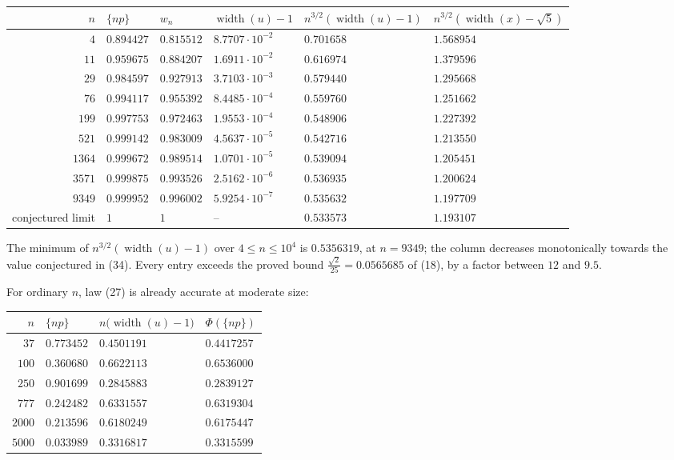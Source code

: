 \documentclass[12pt]{article}
\newcommand{\W}{\operatorname{width}}
\begin{document}
\begin{center}
\small
\renewcommand{\arraystretch}{1.3}
\begin{tabularx}{\textwidth}{@{}rXXXXX@{}}
\toprule
\(n\) & \(\{np\}\) & \(w_n\) & \(\W(u)-1\) & \(n^{3/2}(\W(u)-1)\) & \(n^{3/2}(\W(x)-\sqrt5)\) \\
\midrule
\(4\)    & \(0.894427\) & \(0.815512\) & \(8.7707\cdot10^{-2}\) & \(0.701658\) & \(1.568954\) \\
\(11\)   & \(0.959675\) & \(0.884207\) & \(1.6911\cdot10^{-2}\) & \(0.616974\) & \(1.379596\) \\
\(29\)   & \(0.984597\) & \(0.927913\) & \(3.7103\cdot10^{-3}\) & \(0.579440\) & \(1.295668\) \\
\(76\)   & \(0.994117\) & \(0.955392\) & \(8.4485\cdot10^{-4}\) & \(0.559760\) & \(1.251662\) \\
\(199\)  & \(0.997753\) & \(0.972463\) & \(1.9553\cdot10^{-4}\) & \(0.548906\) & \(1.227392\) \\
\(521\)  & \(0.999142\) & \(0.983009\) & \(4.5637\cdot10^{-5}\) & \(0.542716\) & \(1.213550\) \\
\(1364\) & \(0.999672\) & \(0.989514\) & \(1.0701\cdot10^{-5}\) & \(0.539094\) & \(1.205451\) \\
\(3571\) & \(0.999875\) & \(0.993526\) & \(2.5162\cdot10^{-6}\) & \(0.536935\) & \(1.200624\) \\
\(9349\) & \(0.999952\) & \(0.996002\) & \(5.9254\cdot10^{-7}\) & \(0.535632\) & \(1.197709\) \\
\midrule
conjectured limit & \(1\) & \(1\) & -- & \(0.533573\) & \(1.193107\) \\
\bottomrule
\end{tabularx}
\end{center}

The minimum of \(n^{3/2}(\W(u)-1)\) over \(4\le n\le10^4\) is
\(0.5356319\), at \(n=9349\); the column decreases monotonically towards
the value conjectured in (34). Every entry exceeds the proved bound
\(\frac{\sqrt2}{25}=0.0565685\) of (18), by a factor between \(12\) and
\(9.5\).

For ordinary \(n\), law (27) is already accurate at moderate size:

\begin{center}
\small
\renewcommand{\arraystretch}{1.3}
\begin{tabularx}{0.86\textwidth}{@{}rXXX@{}}
\toprule
\(n\) & \(\{np\}\) & \(n\bigl(\W(u)-1\bigr)\) & \(\Phi(\{np\})\) \\
\midrule
\(37\)   & \(0.773452\) & \(0.4501191\) & \(0.4417257\) \\
\(100\)  & \(0.360680\) & \(0.6622113\) & \(0.6536000\) \\
\(250\)  & \(0.901699\) & \(0.2845883\) & \(0.2839127\) \\
\(777\)  & \(0.242482\) & \(0.6331557\) & \(0.6319304\) \\
\(2000\) & \(0.213596\) & \(0.6180249\) & \(0.6175447\) \\
\(5000\) & \(0.033989\) & \(0.3316817\) & \(0.3315599\) \\
\bottomrule
\end{tabularx}
\end{center}
\end{document}

